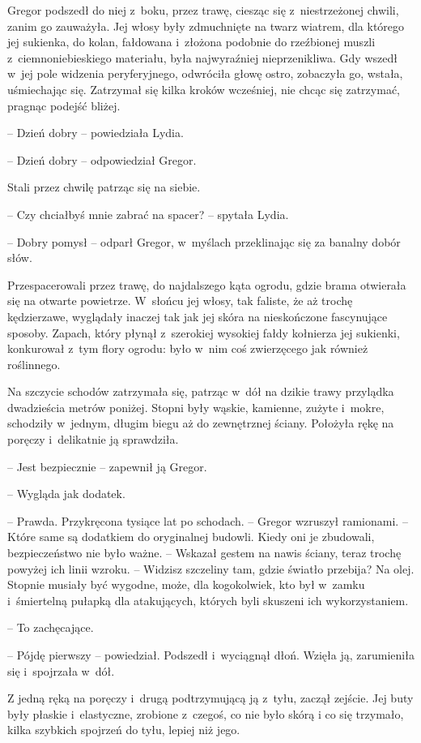 \documentclass[oneside,polish,12pt,sfheadings]{mwbk}
\begin{document}
Gregor podszedł do niej z~boku, przez trawę, ciesząc się z~niestrzeżonej
chwili, zanim go zauważyła. Jej włosy były zdmuchnięte na twarz wiatrem,
dla którego jej sukienka, do kolan, fałdowana i~złożona podobnie do
rzeźbionej muszli z~ciemnoniebieskiego materiału, była najwyraźniej
nieprzenikliwa. Gdy wszedł w~jej pole widzenia peryferyjnego, odwróciła
głowę ostro, zobaczyła go, wstała, uśmiechając się. Zatrzymał się kilka
kroków wcześniej, nie chcąc się zatrzymać, pragnąc podejść bliżej.

-- Dzień dobry -- powiedziała Lydia.

-- Dzień dobry -- odpowiedział Gregor.

Stali przez chwilę patrząc się na siebie.

-- Czy chciałbyś mnie zabrać na spacer? -- spytała Lydia.

-- Dobry pomysł -- odparł Gregor, w~myślach przeklinając się za banalny
dobór słów.

Przespacerowali przez trawę, do najdalszego kąta ogrodu, gdzie brama
otwierała się na otwarte powietrze. W~słońcu jej włosy, tak faliste, że
aż trochę kędzierzawe, wyglądały inaczej tak jak jej skóra na
nieskończone fascynujące sposoby. Zapach, który płynął z~szerokiej
wysokiej fałdy kołnierza jej sukienki, konkurował z~tym flory ogrodu:
było w~nim coś zwierzęcego jak również roślinnego.

Na szczycie schodów zatrzymała się, patrząc w~dół na dzikie trawy
przylądka dwadzieścia metrów poniżej. Stopni były wąskie, kamienne,
zużyte i~mokre, schodziły w~jednym, długim biegu aż do zewnętrznej
ściany. Położyła rękę na poręczy i~delikatnie ją sprawdziła.

-- Jest bezpiecznie -- zapewnił ją Gregor.

-- Wygląda jak dodatek.

-- Prawda. Przykręcona tysiące lat po schodach. -- Gregor wzruszył
ramionami. -- Które same są dodatkiem do oryginalnej budowli. Kiedy oni
je zbudowali, bezpieczeństwo nie było ważne. -- Wskazał gestem na nawis
ściany, teraz trochę powyżej ich linii wzroku. -- Widzisz szczeliny tam,
gdzie światło przebija? Na olej. Stopnie musiały być wygodne, może, dla
kogokolwiek, kto był w~zamku i~śmiertelną pułapką dla atakujących,
których byli skuszeni ich wykorzystaniem.

-- To zachęcające.

-- Pójdę pierwszy -- powiedział. Podszedł i~wyciągnął dłoń. Wzięła ją,
zarumieniła się i~spojrzała w~dół.

Z jedną ręką na poręczy i~drugą podtrzymującą ją z~tyłu, zaczął zejście.
Jej buty były płaskie i~elastyczne, zrobione z~czegoś, co nie było skórą
i co się trzymało, kilka szybkich spojrzeń do tyłu, lepiej niż jego.
\end{document}
